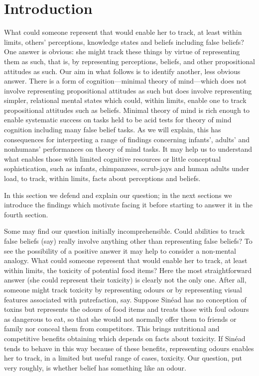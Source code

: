 \documentclass[12pt,\papersize]{extarticle}
\begin{document}
\section{Introduction}
What could someone represent that would enable her to track, at least within limits, others' perceptions, knowledge states and beliefs including false beliefs? 
One answer is obvious: she might track these things by virtue of representing them as such, that is, by representing perceptions, beliefs, and other propositional attitudes as such.
Our aim in what follows is to identify another, less obvious answer.
There is a form of cognition---minimal theory of mind---which does not involve representing propositional attitudes as such but does involve representing simpler, relational mental states which could, within limits, enable one to track propositional attitudes such as beliefs.
Minimal theory of mind 
is  rich enough to enable systematic success on tasks held to be acid tests for theory of mind cognition including many false belief tasks.
As we will explain, this has consequences 
for interpreting a range of findings concerning infants', adults' and nonhumans' performances on theory of mind tasks.
It may help us to understand what enables those with limited cognitive resources or little conceptual sophistication, such as infants, chimpanzees, scrub-jays and human adults under load, to track, within limits, facts about perceptions and beliefs.

In this section we defend and explain our question; in the next sections we introduce the findings which motivate facing it before starting to answer it in the fourth section.

Some may find our question initially incomprehensible.
Could abilities to track false beliefs (say) really involve anything other than representing false beliefs?
To see the possibility of a positive answer it may help to consider a non-mental analogy.
What could someone represent that would enable her to track, at least within limits, the toxicity of potential food items?
Here the most straightforward answer (she could represent their toxicity) is clearly not the only one.
After all, someone might track toxicity by representing odours or by representing visual features associated with putrefaction, say.
Suppose Sin\'ead has no conception of toxins but represents the odours of food items and 
treats those with foul odours as dangerous to eat,
so that she would not normally offer them to friends or family
nor conceal them from competitors.
This brings nutritional and competitive benefits obtaining which depends on facts about toxicity.
If Sin\'ead tends to behave in this way because of these benefits, 
representing odours enables her to track, in a limited but useful range of cases,  toxicity.
Our question, put very roughly, is whether   belief has something like an odour.
\end{document}
